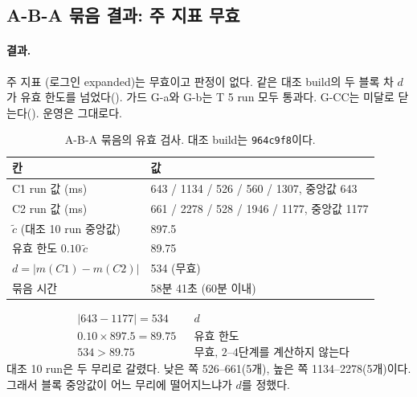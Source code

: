 \subsection{A-B-A 묶음 결과: 주 지표 무효}\label{sec:re-u4-aba}

\paragraph{결과.}
주 지표 (로그인 expanded)는 무효이고 판정이 없다.
같은 대조 build의 두 블록 차 $d$가 유효 한도를 넘었다().
가드 G-a와 G-b는 T 5 run 모두 통과다.
G-CC는 미달로 닫는다(). 운영은  그대로다.
\begin{table}[H]
  \caption{A-B-A 묶음의 유효 검사. 대조 build는 \texttt{964c9f8}이다.}
  \label{tab:re-aba}
  \centering\small
  \begin{tabularx}{\linewidth}{@{}L{3.2cm} Y@{}}
    \toprule
    칸 & 값 \\
    \midrule
    C1 run 값 (ms) & 643 / 1134 / 526 / 560 / 1307, 중앙값 643 \\
    \midrule
    C2 run 값 (ms) & 661 / 2278 / 528 / 1946 / 1177, 중앙값 1177 \\
    \midrule
    $\tilde c$ (대조 10 run 중앙값) & 897.5 \\
    \midrule
    유효 한도 $0.10\,\tilde c$ & 89.75 \\
    \midrule
    $d=|m(C1)-m(C2)|$ & 534 (무효) \\
    \midrule
    묶음 시간 & 58분 41초 (60분 이내) \\
    \bottomrule
  \end{tabularx}
\end{table}
\begin{align*}
  &|643-1177| = 534 && d\\
  &0.10\times 897.5 = 89.75 && \text{유효 한도}\\
  &534 > 89.75 && \text{무효, 2--4단계를 계산하지 않는다}
\end{align*}
대조 10 run은 두 무리로 갈렸다. 낮은 쪽 526--661(5개), 높은 쪽 1134--2278(5개)이다.
그래서 블록 중앙값이 어느 무리에 떨어지느냐가 $d$를 정했다.

